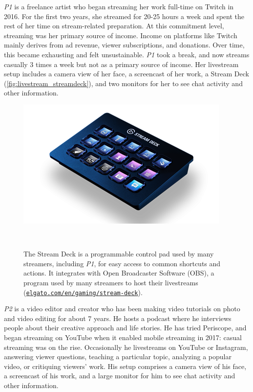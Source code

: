 \textit{P1} is a freelance artist who began streaming her work full-time on Twitch in 2016. For the first two years, she streamed for 20-25 hours a week and spent the rest of her time on stream-related preparation. At this commitment level, streaming was her primary source of income. Income on platforms like Twitch mainly derives from ad revenue, viewer subscriptions, and donations. Over time, this became exhausting and felt unsustainable. \textit{P1} took a break, and now streams casually 3 times a week but not as a primary source of income. Her livestream setup includes a camera view of her face, a screencast of her work, a Stream Deck (\autoref{fig:livestream_streamdeck}), and two monitors for her to see chat activity and other information.

\begin{figure}[b]
\centering
  \includegraphics[width=0.6\columnwidth]{livestreams/figures/streamdeck.png}
  \caption{The Stream Deck is a programmable control pad used by many streamers, including \textit{P1}, for easy access to common shortcuts and actions. It integrates with Open Broadcaster Software (OBS), a program used by many streamers to host their livestreams (\href{https://www.elgato.com/en/gaming/stream-deck}{\nolinkurl{elgato.com/en/gaming/stream-deck}}).}~\label{fig:livestream_streamdeck}
  \vspace{-0.2in}
\end{figure}

\textit{P2} is a video editor and creator who has been making video tutorials on photo and video editing for about 7 years. He hosts a podcast where he interviews people about their creative approach and life stories. He has tried Periscope, and began streaming on YouTube when it enabled mobile streaming in 2017: casual streaming was on the rise. Occasionally he livestreams on YouTube or Instagram, answering viewer questions, teaching a particular topic, analyzing a popular video, or critiquing viewers' work. His setup comprises a camera view of his face, a screencast of his work, and a large monitor for him to see chat activity and other information.

